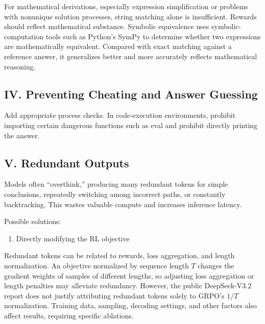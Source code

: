 For mathematical derivations, especially expression simplification or problems with nonunique solution processes, string matching alone is insufficient. Rewards should reflect mathematical substance. Symbolic equivalence uses symbolic-computation tools such as Python's SymPy to determine whether two expressions are mathematically equivalent. Compared with exact matching against a reference answer, it generalizes better and more accurately reflects mathematical reasoning.

\hypertarget{iv.-preventing-cheating-and-answer-guessing}{%
\subsection{IV. Preventing Cheating and Answer Guessing}\label{iv.-preventing-cheating-and-answer-guessing}}

Add appropriate process checks. In code-execution environments, prohibit importing certain dangerous functions such as eval and prohibit directly printing the answer.

\hypertarget{v.-redundant-outputs}{%
\subsection{V. Redundant Outputs}\label{v.-redundant-outputs}}

Models often ``overthink,'' producing many redundant tokens for simple conclusions, repeatedly switching among incorrect paths, or constantly backtracking. This wastes valuable compute and increases inference latency.

Possible solutions:

\begin{enumerate}
\def\labelenumi{\arabic{enumi}.}
\tightlist
\item
  Directly modifying the RL objective
\end{enumerate}

Redundant tokens can be related to rewards, loss aggregation, and length normalization. An objective normalized by sequence length \(T\) changes the gradient weights of samples of different lengths, so adjusting loss aggregation or length penalties may alleviate redundancy. However, the public DeepSeek-V3.2 report does not justify attributing redundant tokens solely to GRPO's \(1/T\) normalization. Training data, sampling, decoding settings, and other factors also affect results, requiring specific ablations.

